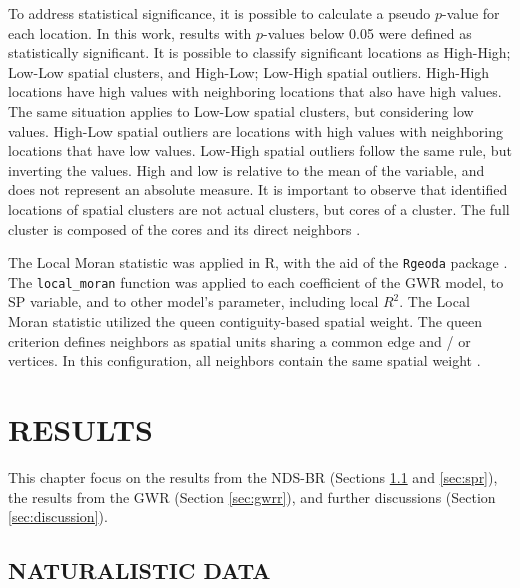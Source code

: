 To address statistical significance, it is possible to calculate a pseudo $p$-value for each location. In this work, results with $p$-values below 0.05 were defined as statistically significant. It is possible to classify significant locations as High-High; Low-Low spatial clusters, and High-Low; Low-High spatial outliers. High-High locations have high values with neighboring locations that also have high values. The same situation applies to Low-Low spatial clusters, but considering low values. High-Low spatial outliers are locations with high values with neighboring locations that have low values. Low-High spatial outliers follow the same rule, but inverting the values. High and low is relative to the mean of the variable, and does not represent an absolute measure. It is important to observe that identified locations of spatial clusters are not actual clusters, but cores of a cluster. The full cluster is composed of the cores and its direct neighbors \cite{anselinLocalIndicatorsSpatial2010}.

The Local Moran statistic was applied in R, with the aid of the \verb|Rgeoda| package \cite{liRgeodaLibrarySpatial2021}. The \verb|local_moran| function was applied to each coefficient of the GWR model, to SP variable, and to other model's parameter, including local $R^2$. The Local Moran statistic utilized the queen contiguity-based spatial weight. The queen criterion defines neighbors as spatial units sharing a common edge and / or vertices. In this configuration, all neighbors contain the same spatial weight \cite{Bivand2013}. 


\chapter{RESULTS} \label{cap:results}


This chapter focus on the results from the NDS-BR (Sections \ref{sec:ndsr} and \ref{sec:spr}), the results from the GWR (Section \ref{sec:gwrr}), and further discussions (Section \ref{sec:discussion}).

\section{NATURALISTIC DATA} \label{sec:ndsr}


